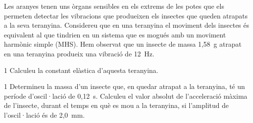 Les aranyes tenen uns òrgans sensibles en els extrems de les potes que els permeten detectar les vibracions que produeixen els insectes que queden atrapats a la seva teranyina. Considereu que en una teranyina el moviment dels insectes és equivalent al que tindrien en un sistema que es mogués amb un moviment harmònic simple (MHS). Hem observat que un insecte de massa 1,58~g atrapat en una teranyina produeix una vibració de 12~Hz.


\begin{apartat}{1}
Calculeu la constant elàstica d'aquesta teranyina.
\end{apartat}

\begin{apartat}{1}
Determineu la massa d'un insecte que, en quedar atrapat a la teranyina, té un període d'oscil·lació de 0,12~s. Calculeu el valor absolut de l'acceleració màxima de l'insecte, durant el temps en què es mou a la teranyina, si l'amplitud de l'oscil·lació és de 2,0~mm.
\end{apartat}
